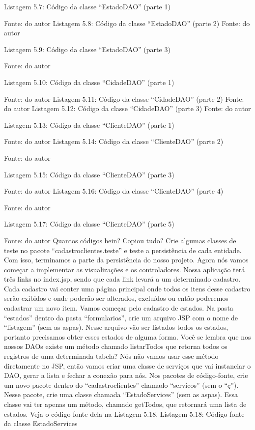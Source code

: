 Listagem 5.7: Código da classe ``EstadoDAO'' (parte 1)
 
Fonte: do autor
Listagem 5.8: Código da classe ``EstadoDAO'' (parte 2)
 Fonte: do autor






Listagem 5.9: Código da classe ``EstadoDAO'' (parte 3)
 
Fonte: do autor











Listagem 5.10: Código da classe ``CidadeDAO'' (parte 1)
 
Fonte: do autor
Listagem 5.11: Código da classe ``CidadeDAO'' (parte 2)
 Fonte: do autor
Listagem 5.12: Código da classe ``CidadeDAO'' (parte 3)
 Fonte: do autor




Listagem 5.13: Código da classe ``ClienteDAO'' (parte 1)
 
Fonte: do autor
Listagem 5.14: Código da classe ``ClienteDAO'' (parte 2)
 
Fonte: do autor


Listagem 5.15: Código da classe ``ClienteDAO'' (parte 3)
 
Fonte: do autor
Listagem 5.16: Código da classe ``ClienteDAO'' (parte 4)
 
Fonte: do autor



Listagem 5.17: Código da classe ``ClienteDAO'' (parte 5)
 
Fonte: do autor
Quantos códigos hein? Copiou tudo? Crie algumas classes de teste no pacote ``cadastroclientes.teste'' e teste a persistência de cada entidade. Com isso, terminamos a parte da persistência do nosso projeto.
Agora nós vamos começar a implementar as visualizações e os controladores. Nossa aplicação terá três links no index.jsp, sendo que cada link levará a um determinado cadastro. Cada cadastro vai conter uma página principal onde todos os itens desse cadastro serão exibidos e onde poderão ser alterados, excluídos ou então poderemos cadastrar um novo item.
Vamos começar pelo cadastro de estados. Na pasta ``estados'' dentro da pasta ``formularios'', crie um arquivo JSP com o nome de ``listagem'' (sem as aspas). Nesse arquivo vão ser listados todos os estados, portanto precisamos obter esses estados de alguma forma. Você se lembra que nos nossos DAOs existe um método chamado listarTodos que retorna todos os registros de uma determinada tabela? Nós não vamos usar esse método diretamente no JSP, então vamos criar uma classe de serviços que vai instanciar o DAO, gerar a lista e fechar a conexão para nós. Nos pacotes de código-fonte, crie um novo pacote dentro do ``cadastroclientes'' chamado ``servicos'' (sem o ``ç''). Nesse pacote, crie uma classe chamada ``EstadoServices'' (sem as aspas). Essa classe vai ter apenas um método, chamado getTodos, que retornará uma lista de estados. Veja o código-fonte dela na Listagem 5.18.
Listagem 5.18: Código-fonte da classe EstadoServices
 
